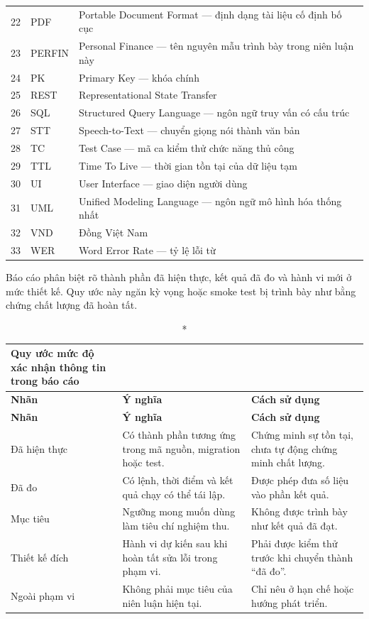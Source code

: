 \begin{longtable}{@{}C{0.9cm}L{3.0cm}L{10.4cm}@{}}
  22 & PDF & Portable Document Format --- định dạng tài liệu cố định bố cục \\
  23 & PERFIN & Personal Finance --- tên nguyên mẫu trình bày trong niên luận này \\
  24 & PK & Primary Key --- khóa chính \\
  25 & REST & Representational State Transfer \\
  26 & SQL & Structured Query Language --- ngôn ngữ truy vấn có cấu trúc \\
  27 & STT & Speech-to-Text --- chuyển giọng nói thành văn bản \\
  28 & TC & Test Case --- mã ca kiểm thử chức năng thủ công \\
  29 & TTL & Time To Live --- thời gian tồn tại của dữ liệu tạm \\
  30 & UI & User Interface --- giao diện người dùng \\
  31 & UML & Unified Modeling Language --- ngôn ngữ mô hình hóa thống nhất \\
  32 & VND & Đồng Việt Nam \\
  33 & WER & Word Error Rate --- tỷ lệ lỗi từ \\
  \bottomrule
\end{longtable}

\setcounter{table}{0}


Báo cáo phân biệt rõ thành phần đã hiện thực, kết quả đã đo và hành vi mới ở
mức thiết kế. Quy ước này ngăn kỳ vọng hoặc smoke test bị trình bày như bằng
chứng chất lượng đã hoàn tất.

\begin{longtable}{@{}L{3.0cm}L{5.2cm}L{5.8cm}@{}}
  \caption*{Quy ước mức độ xác nhận thông tin trong báo cáo}\\
  \toprule
  \textbf{Nhãn} & \textbf{Ý nghĩa} & \textbf{Cách sử dụng} \\
  \midrule
  \endfirsthead
  \toprule
  \textbf{Nhãn} & \textbf{Ý nghĩa} & \textbf{Cách sử dụng} \\
  \midrule
  \endhead
  Đã hiện thực & Có thành phần tương ứng trong mã nguồn, migration hoặc test. & Chứng minh sự tồn tại, chưa tự động chứng minh chất lượng. \\
  Đã đo & Có lệnh, thời điểm và kết quả chạy có thể tái lập. & Được phép đưa số liệu vào phần kết quả. \\
  Mục tiêu & Ngưỡng mong muốn dùng làm tiêu chí nghiệm thu. & Không được trình bày như kết quả đã đạt. \\
  Thiết kế đích & Hành vi dự kiến sau khi hoàn tất sửa lỗi trong phạm vi. & Phải được kiểm thử trước khi chuyển thành ``đã đo''. \\
  Ngoài phạm vi & Không phải mục tiêu của niên luận hiện tại. & Chỉ nêu ở hạn chế hoặc hướng phát triển. \\
  \bottomrule
\end{longtable}
